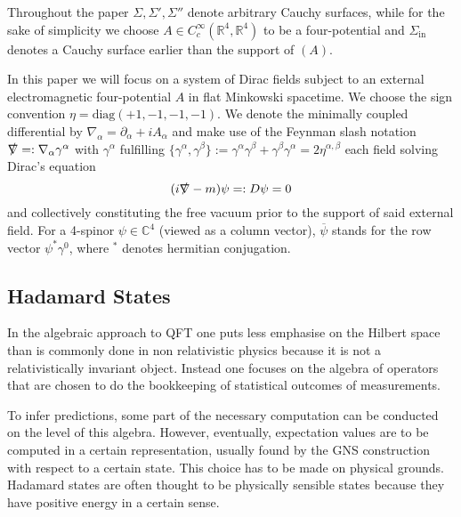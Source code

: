 \documentclass[b5paper,draft,openbib,12pt]{memoir}
\begin{document}
Throughout the paper
\(\Sigma, \Sigma', \Sigma''\) denote arbitrary Cauchy surfaces, while for the sake of simplicity we choose \(A\in C_c^\infty(\mathbb{R}^4,\mathbb{R}^4)\) 
to be a four-potential and \(\Sigma_{\text{in}}\) denotes a Cauchy surface earlier than the support of \((A)\).

In this paper we will focus on a system of Dirac fields subject to an external electromagnetic four-potential \(A\) in flat Minkowski spacetime.
We choose the sign convention \(\eta=\text{diag}(+1,-1,-1,-1)\). We denote the minimally coupled differential by \(\nabla_{\alpha} = \partial_{\alpha} + i A_{\alpha}\)
and make use of the Feynman slash notation \(\slashed{\nabla}=:\nabla_{\alpha}\gamma^\alpha\) with \(\gamma^\alpha\) fulfilling 
\(\{\gamma^\alpha , \gamma^\beta\}:=\gamma^\alpha  \gamma^\beta+\gamma^\beta  \gamma^\alpha  = 2 \eta^{\alpha,\beta}\)  each field solving 
Dirac's equation
\begin{equation}\label{dirac}
(i\slashed{\nabla}-m)\psi =: D\psi= 0
\end{equation}
and collectively constituting the free vacuum prior to the support of said external field.
For a 4-spinor \(\psi\in\mathbb{C}^4\) (viewed as a column vector), \(\overline{\psi}\) stands for the row vector \(\psi^*\gamma^0\), where \({}^*\) denotes hermitian conjugation.



\subsection{Hadamard States}\label{sec:hadamard}
In the algebraic approach to QFT one puts less emphasise on the Hilbert space than is commonly done in non relativistic physics because 
it is not a relativistically invariant object.
Instead one focuses on the algebra of operators that are chosen to do the bookkeeping of statistical outcomes of measurements. 

To infer predictions, some part of the necessary computation can be conducted on the level of this algebra. However,
eventually, expectation values are to be computed in a certain representation, usually found by the GNS construction
with respect to a certain state.
This choice has to be made on physical grounds. 
Hadamard states are often thought to be physically sensible states because they have positive energy in a certain sense.
\end{document}
